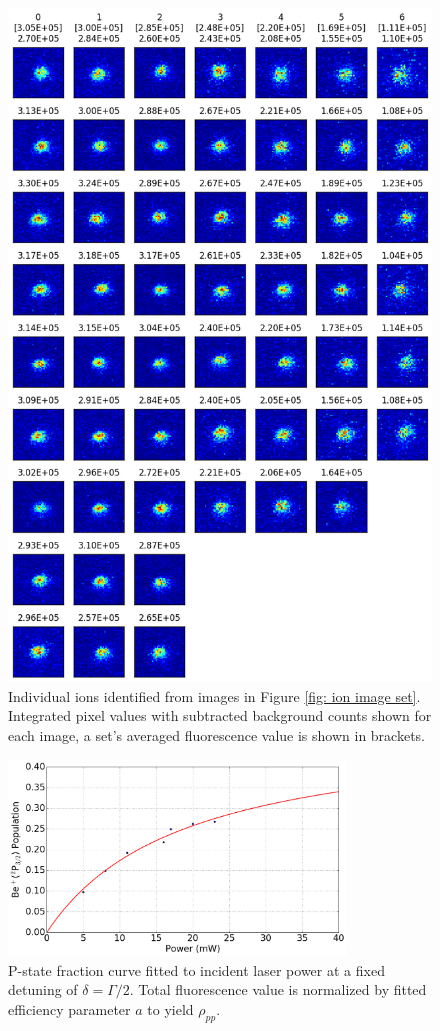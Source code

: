 \begin{figure}[H]
	\centering
	\includegraphics[height=0.7\paperheight]{images/isolated_ions.png}
	\caption{Individual ions identified from images in Figure \ref{fig: ion image set}. Integrated pixel values with subtracted background counts shown for each image, a set's averaged fluorescence value is shown in brackets.}
	\label{fig: local ions}
\end{figure}

\begin{figure}
	\centering
	\includegraphics[width=0.8\textwidth]{images/P_state_curve.png}
	\caption{P-state fraction curve fitted to incident laser power at a fixed detuning of $\delta = \Gamma/2$. Total fluorescence value is normalized by fitted efficiency parameter $a$ to yield $\rho_{pp}$.}
	\label{fig: p state curve}
\end{figure}